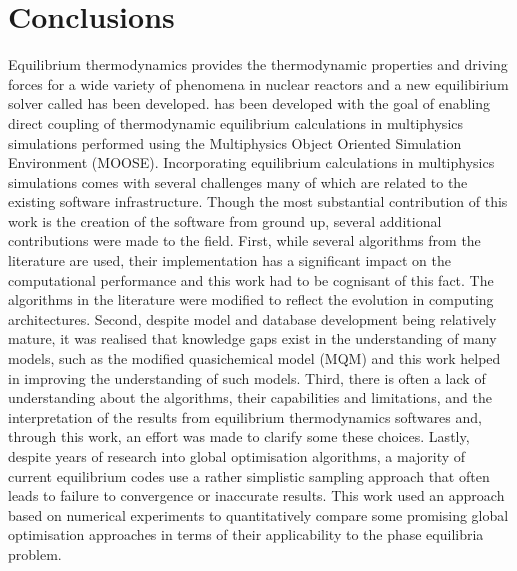 \chapter{Conclusions} \label{chap:conclusions}

	Equilibrium thermodynamics provides the thermodynamic properties and driving forces for a wide variety of phenomena in nuclear reactors and a new equilibirium solver called {\GEM} has been developed. {\GEM} has been developed with the goal of enabling direct coupling of thermodynamic equilibrium calculations in multiphysics simulations performed using the Multiphysics Object Oriented Simulation Environment (MOOSE). Incorporating equilibrium calculations in multiphysics simulations comes with several challenges many of which are related to the existing software infrastructure. Though the most substantial contribution of this work is the creation of the software from ground up, several additional contributions were made to the field. First, while several algorithms from the literature are used, their implementation has a significant impact on the computational performance and this work had to be cognisant of this fact. The algorithms in the literature were modified to reflect the evolution in computing architectures. Second, despite model and database development being relatively mature, it was realised that knowledge gaps exist in the understanding of many models, such as the modified quasichemical model (MQM) and this work helped in improving the understanding of such models. Third, there is often a lack of understanding about the algorithms, their capabilities and limitations, and the interpretation of the results from equilibrium thermodynamics softwares and, through this work, an effort was made to clarify some these choices. Lastly, despite years of research into global optimisation algorithms, a majority of current equilibrium codes use a rather simplistic sampling approach that often leads to failure to convergence or inaccurate results. This work used an approach based on numerical experiments to quantitatively compare some promising global optimisation approaches in terms of their applicability to the phase equilibria problem. 

